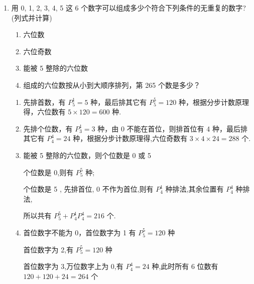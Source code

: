 \begin{enumerate}
\begin{enumerate}
\begin{jieda}
\begin{enumerate}
                由分类加法计数原理得 $P_{2}^{1}P_{4}^{4} + P_{2}^{2}P_{3}^{3} + P_{2}^{2}P_{2}^{2} + 1 = {65}$ ,
                
                所以组成无重复数字的五位数中比 21034 大的数有 65 个.
            \end{enumerate}
        \end{jieda}
        
        \item 用 0, 1, 2, 3, 4, 5 这 6 个数字可以组成多少个符合下列条件的无重复的数字? (列式并计算)
        \begin{enumerate}
            \item 六位数
            \item 六位奇数
            \item 能被 5 整除的六位数
            \item 组成的六位数按从小到大顺序排列，第 265 个数是多少？
        \end{enumerate}
        \begin{jieda}
            \begin{enumerate}
                \item 先排首数，有 $P_{5}^{1} = 5$ 种，最后排其它有 $P_{5}^{5} = {120}$ 种，根据分步计数原理得，六位数有 $5 \times  {120} = {600}$ 种.
                
                \item 先排个位数，有 $P_{3}^{1} = 3$ 种，由 0 不能在首位，则排首位有 4 种，最后排其它有 $P_{4}^{4} = {24}$ 种，根据分步计数原理得,六位奇数有 $3 \times  4 \times  {24} = {288}$ 个.

                \item 能被 5 整除的六位数，则个位数是 0 或 5
                
                个位数是 0,则有 $P_{5}^{5}$ 种;

                个位数是 5 , 先排首位, 0 不作为首位,则有 $P_{4}^{1}$ 种排法,其余位置有 $P_{4}^{4}$ 种排法,

                所以共有 $P_{5}^{5} + P_{4}^{1}P_{4}^{4} = {216}$ 个.

                \item 首位数字不能为 0，首位数字为 1 有 $P_{5}^{5} = {120}$ 种
                
                首位数字为 2,有 $P_{5}^{5} = {120}$ 种
                
                首位数字为 3,万位数字上为 0,有 $P_{4}^{4} = {24}$ 种,此时所有 6 位数有 ${120} + {120} + {24} = {264}$ 个
                

\end{enumerate}
\end{jieda}
\end{enumerate}
\end{enumerate}
